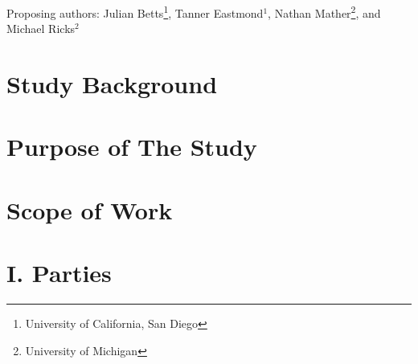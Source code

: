 \documentclass[letterpaper,12pt]{article}
\begin{document}
\noindent Proposing authors: Julian Betts\footnote{University of California, San Diego}, Tanner Eastmond$^1$, Nathan Mather\footnote{University of Michigan}, and Michael Ricks$^2$





\section{Study Background}

\section{Purpose of The Study}

\section{Scope of Work}

\section{I. Parties}


 
 
\end{document}
